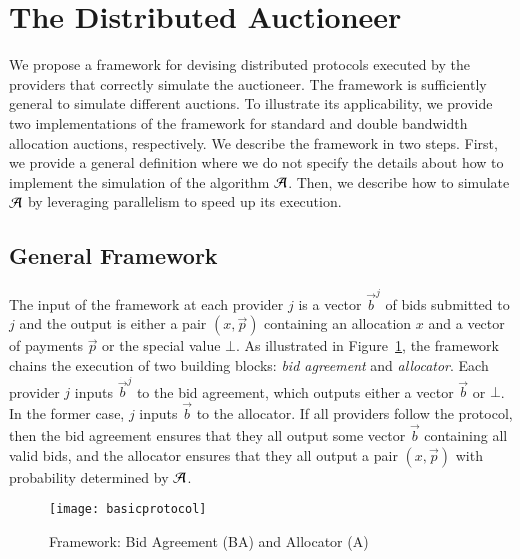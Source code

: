 
\section{The Distributed Auctioneer}
\label{sec:design}

We propose a framework for devising distributed 
protocols executed by the providers that correctly simulate the auctioneer.
The framework is sufficiently general to simulate different auctions.
To illustrate its applicability, we provide two implementations 
of the framework for standard and double 
bandwidth allocation auctions, respectively.
We describe the framework in two steps. First, we provide a general definition
where we do not specify the details about how to implement the simulation
of the algorithm $\mathcal{A}$. Then, we describe how to simulate $\mathcal{A}$
by leveraging parallelism to speed up its execution.


\subsection{General Framework}
The input of the framework at each provider $j$ is a vector $\vec{b}^j$
of bids submitted to $j$ and the output is either a pair $(x,\vec{p})$ containing
an allocation $x$ and a vector of payments $\vec{p}$ or the special value $\bot$.
As illustrated in Figure~\ref{fig:framework}, the framework chains the execution
of two building blocks: \emph{bid agreement} and \emph{allocator}.
Each provider $j$ inputs $\vec{b}^j$ to the bid agreement,
which outputs either a vector $\vec{b}$ or $\bot$.
In the former case, $j$ inputs $\vec{b}$ to the allocator.
If all providers follow the protocol, then the bid agreement ensures
that they all output some vector $\vec{b}$ containing all valid bids,
and the allocator ensures that they all output a pair $(x,\vec{p})$
with probability determined by $\mathcal{A}$.

\begin{figure}[tbp]
	\centering
	\texttt{[image: basicprotocol]}
	\caption{Framework: Bid Agreement (BA) and Allocator (A)}
	\label{fig:framework}
\end{figure}

